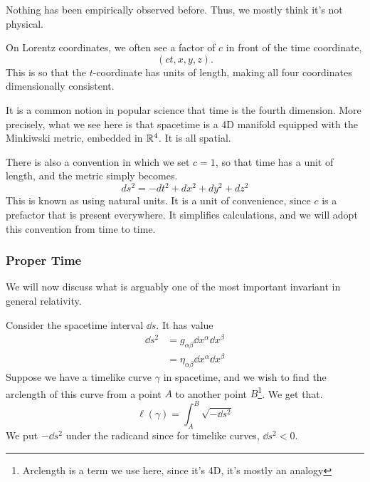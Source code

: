 		Nothing has been empirically observed before. 
		Thus, we mostly think it's not physical.  

		\begin{remark}
			On Lorentz coordinates, we often see a factor of $c$
			in front of the time coordinate,
			\[
				(ct,x,y,z).
			\]
			This is so that the $t$-coordinate has units of length,
			making all four coordinates dimensionally consistent.

			\hspace{1em}It is a common notion in popular science that time is
			the fourth dimension. More precisely, what we see here is
			that spacetime is a 4D manifold equipped with the Minkiwski
			metric, embedded in $\mathbb{R}^4$. It is all spatial.

			\hspace{1em}There is also a convention in which we set $c=1$, so that 
			time has a unit of length, and
			the metric simply becomes.
			\[
				ds^2 = - dt^2 + dx^2 + dy^2 + dz^2
			\]
			This is known as using natural units. It is a unit 
			of convenience, since $c$ is a prefactor that is present
			everywhere. It simplifies
			calculations, and we will adopt
			this convention from time to time.
		\end{remark}

	\subsubsection{Proper Time}	
		\label{subsubsec:proper-time}

		We will now discuss what is arguably one of the 
		most important invariant in general relativity.

		Consider the spacetime interval $\dd{s}$. It has value
		\begin{align*}
			\dd{s^2} &= g_{\alpha\beta}\dd{x^\alpha}\dd{x^\beta}\\
					 &=\eta_{\alpha\beta}\dd{x^\alpha}\dd{x^\beta}
		\end{align*}
		Suppose
		we have a timelike curve $\gamma$ in spacetime, and we wish 
		to find the arclength of this curve from a point $A$ to
		another point $B$\footnote{Arclength is a term we use here, since it's 4D, it's mostly an analogy}.
		We get that.
		\[
			\ell(\gamma) 
			=
			\int_A^B \sqrt{-\dd{s^2}}
		\]
		We put $-\dd{s^2}$ under the radicand since for timelike curves,
		$\dd{s^2}<0$.

